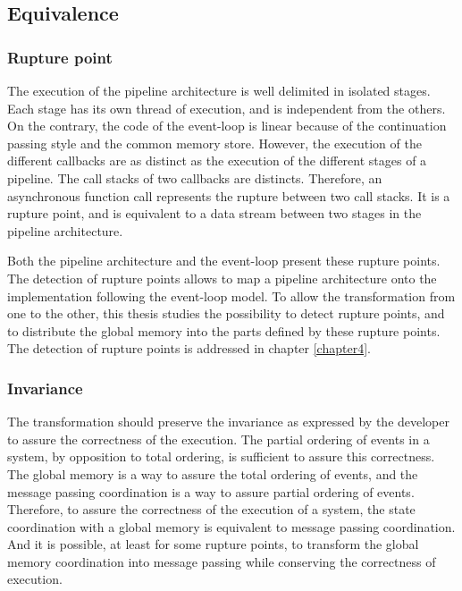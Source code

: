 \subsection{Equivalence}

\subsubsection{Rupture point}

The execution of the pipeline architecture is well delimited in isolated stages.
Each stage has its own thread of execution, and is independent from the others.
On the contrary, the code of the event-loop is linear because of the continuation passing style and the common memory store.
However, the execution of the different callbacks are as distinct as the execution of the different stages of a pipeline.
The call stacks of two callbacks are distincts.
Therefore, an asynchronous function call represents the rupture between two call stacks.
It is a rupture point, and is equivalent to a data stream between two stages in the pipeline architecture.

Both the pipeline architecture and the event-loop present these rupture points.
The detection of rupture points allows to map a pipeline architecture onto the implementation following the event-loop model.
To allow the transformation from one to the other, this thesis studies the possibility to detect rupture points, and to distribute the global memory into the parts defined by these rupture points.
The detection of rupture points is addressed in chapter \ref{chapter4}.

\subsubsection{Invariance}


The transformation should preserve the invariance as expressed by the developer to assure the correctness of the execution.
The partial ordering of events in a system, by opposition to total ordering, is sufficient to assure this correctness.
The global memory is a way to assure the total ordering of events, and the message passing coordination is a way to assure partial ordering of events.
Therefore, to assure the correctness of the execution of a system, the state coordination with a global memory is equivalent to message passing coordination.
And it is possible, at least for some rupture points, to transform the global memory coordination into message passing while conserving the correctness of execution.

